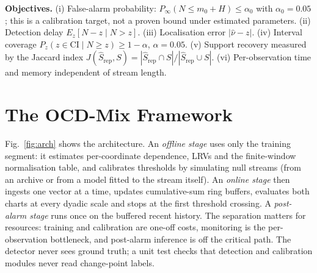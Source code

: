 \documentclass[conference]{IEEEtran}
\begin{document}
\textbf{Objectives.} (i) False-alarm probability: $P_\infty(N\le m_0+H)\le\alpha_0$ with $\alpha_0=0.05$; this is a calibration target, not a proven bound under estimated parameters. (ii) Detection delay $E_z[N-z\mid N>z]$. (iii) Localisation error $|\hat\nu-z|$. (iv) Interval coverage $P_z(z\in\mathrm{CI}\mid N\ge z)\ge 1-\alpha$, $\alpha=0.05$. (v) Support recovery measured by the Jaccard index $J(\hat S_{\mathrm{rep}},S)=|\hat S_{\mathrm{rep}}\cap S|/|\hat S_{\mathrm{rep}}\cup S|$. (vi) Per-observation time and memory independent of stream length.

\section{The OCD-Mix Framework}
Fig.~\ref{fig:arch} shows the architecture. An \emph{offline stage} uses only the training segment: it estimates per-coordinate dependence, LRVs and the finite-window normalisation table, and calibrates thresholds by simulating null streams (from an archive or from a model fitted to the stream itself). An \emph{online stage} then ingests one vector at a time, updates cumulative-sum ring buffers, evaluates both charts at every dyadic scale and stops at the first threshold crossing. A \emph{post-alarm stage} runs once on the buffered recent history. The separation matters for resources: training and calibration are one-off costs, monitoring is the per-observation bottleneck, and post-alarm inference is off the critical path. The detector never sees ground truth; a unit test checks that detection and calibration modules never read change-point labels.
\end{document}
